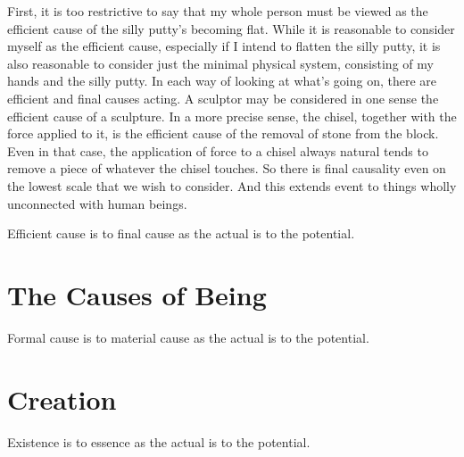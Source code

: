\documentclass[twocolumn]{article}
\begin{document}
First, it is too restrictive to say that my whole person must be viewed as the
efficient cause of the silly putty's becoming flat.  While it is reasonable to
consider myself as the efficient cause, especially if I intend to flatten the
silly putty, it is also reasonable to consider just the minimal physical
system, consisting of my hands and the silly putty.  In each way of looking at
what's going on, there are efficient and final causes acting.  A sculptor may
be considered in one sense the efficient cause of a sculpture.  In a more
precise sense, the chisel, together with the force applied to it, is the
efficient cause of the removal of stone from the block.  Even in that case, the
application of force to a chisel always natural tends to remove a piece of
whatever the chisel touches.  So there is final causality even on the lowest
scale that we wish to consider.  And this extends event to things wholly
unconnected with human beings.

Efficient cause is to final cause as the actual is to the potential.

\section{The Causes of Being}

Formal cause is to material cause as the actual is to the potential.

\section{Creation}

Existence is to essence as the actual is to the potential.


\end{document}
